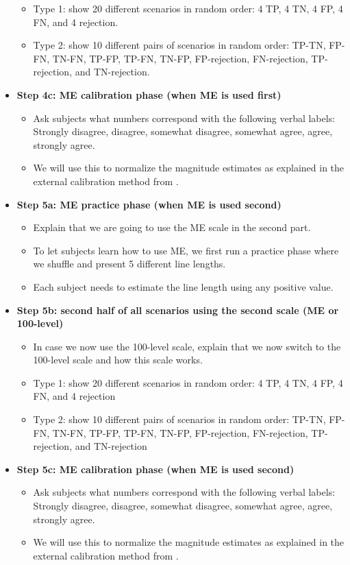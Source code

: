 \documentclass[a4paper]{article}
\begin{document}
\begin{itemize}[leftmargin=*, label={}]
\begin{itemize}
              \item Type 1: show 20 different scenarios in random order: 4 TP, 4 TN, 4 FP, 4 FN, and 4 rejection.
              \item Type 2: show 10 different pairs of scenarios in random order: TP-TN, FP-FN, TN-FN, TP-FP, TP-FN, TN-FP, FP-rejection, FN-rejection, TP-rejection, and TN-rejection.
          \end{itemize}
    \item \textbf{Step 4c: ME calibration phase (when ME is used first)}
          \begin{itemize}
              \item Ask subjects what numbers correspond with the following verbal labels: Strongly disagree, disagree, somewhat disagree, somewhat agree, agree, strongly agree.
              \item We will use this to normalize the magnitude estimates as explained in the external calibration method from \cite{moskowitz1977magnitude}.
          \end{itemize}
    \item \textbf{Step 5a: ME practice phase (when ME is used second)}
          \begin{itemize}
              \item Explain that we are going to use the ME scale in the second part.
              \item To let subjects learn how to use ME, we first run a practice phase where we shuffle and present 5 different line lengths.
              \item Each subject needs to estimate the line length using any positive value.
          \end{itemize}
    \item \textbf{Step 5b: second half of all scenarios using the second scale (ME or 100-level)}
          \begin{itemize}
              \item In case we now use the 100-level scale, explain that we now switch to the 100-level scale and how this scale works.
              \item Type 1: show 20 different scenarios in random order: 4 TP, 4 TN, 4 FP, 4 FN, and 4 rejection
              \item Type 2: show 10 different pairs of scenarios in random order: TP-TN, FP-FN, TN-FN, TP-FP, TP-FN, TN-FP, FP-rejection, FN-rejection, TP-rejection, and TN-rejection
          \end{itemize}
    \item \textbf{Step 5c: ME calibration phase (when ME is used second)}
          \begin{itemize}
              \item Ask subjects what numbers correspond with the following verbal labels: Strongly disagree, disagree, somewhat disagree, somewhat agree, agree, strongly agree.
              \item We will use this to normalize the magnitude estimates as explained in the external calibration method from \cite{moskowitz1977magnitude}.
          \end{itemize}


\end{itemize}
\end{document}
